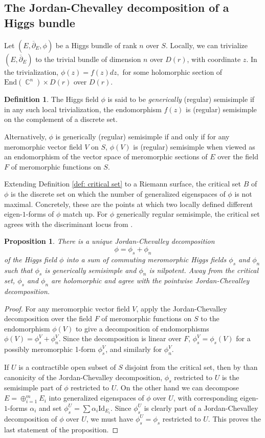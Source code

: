 \documentclass[10pt]{amsart}
\newtheorem{prop}[thm]{Proposition}
\theoremstyle{definition}
\newtheorem{defn}[thm]{Definition}
\DeclareMathOperator{\C}{\mathbb{C}}
\begin{document}
\subsection{The Jordan-Chevalley decomposition of a Higgs bundle} 
Let $(E,\overline{\partial}_E,\phi)$ be a Higgs bundle of rank $n$ over $S$. Locally, we can trivialize $(E,\overline{\partial}_E)$ to the trivial bundle of dimension $n$ over $D(r)$, with coordinate $z$. In the trivialization, $\phi(z)=f(z)dz,$ for some holomorphic section of $\textrm{End}(\C^n)\times D(r)$ over $D(r)$.

\begin{defn}The Higgs field $\phi$ is said to be \emph{generically} (regular) semisimple if in any such local trivialization, the endomorphism $f(z)$ is (regular) semisimple on the complement of a discrete set.
\end{defn}

Alternatively, $\phi$ is generically (regular) semisimple if and only if for any meromorphic vector field $V$ on $S$, $\phi(V)$ is (regular) semisimple when viewed as an endomorphism of the vector space of meromorphic sections of $E$ over the field $F$ of meromorphic functions on $S$.

Extending Definition \ref{def: critical set} to a Riemann surface, the critical set $B$ of $\phi$ is the discrete set on which the number of generalized eigenspaces of $\phi$ is not maximal. Concretely, these are the points at which two locally defined different eigen-$1$-forms of $\phi$ match up. For $\phi$ generically regular semisimple, the critical set agrees with the discriminant locus from \cite{Mo}.
\begin{prop}\label{JCdec}
There is a unique Jordan-Chevalley decomposition
$$\phi = \phi_s + \phi_n
$$
of the Higgs field $\phi$ into a sum of commuting meromorphic Higgs fields $\phi_s$ and $\phi_n$ such that $\phi_s$ is generically semisimple and $\phi_n$ is nilpotent. Away from the critical set, $\phi_s$ and $\phi_n$ are holomorphic and agree with the pointwise Jordan-Chevalley decomposition.
\end{prop}

\begin{proof}
For any meromorphic vector field $V$, apply the Jordan-Chevalley decomposition over the field $F$ of meromorphic functions on $S$ to the endomorphism $\phi(V)$ to give a decomposition of endomorphisms $\phi(V) = \phi^V_{s} + \phi^V_n$. Since the decomposition is linear over $F$, $\phi^V_{s} = \phi_s(V)$ for a possibly meromorphic 1-form $\phi_s^V$, and similarly for $\phi^V_n$.

If $U$ is a contractible open subset of $S$ disjoint from the critical set, then by than canonicity of the Jordan-Chevalley decomposition, $\phi_s$ restricted to $U$ is the semisimple part of $\phi$ restricted to $U$. On the other hand we can decompose $E = \oplus_{i=1}^m E_i$ into generalized eigenspaces of $\phi$ over $U$, with corresponding eigen-$1$-forms $\alpha_i$ and set $\phi_s^U = \sum \alpha_i \mathrm{Id}_{E_i}$. Since $\phi_s^U$ is clearly part of a Jordan-Chevalley decomposition of $\phi$ over $U$, we must have $\phi_s^U = \phi_s$ restricted to $U$. This proves the last statement of the proposition.
\end{proof}
\end{document}
